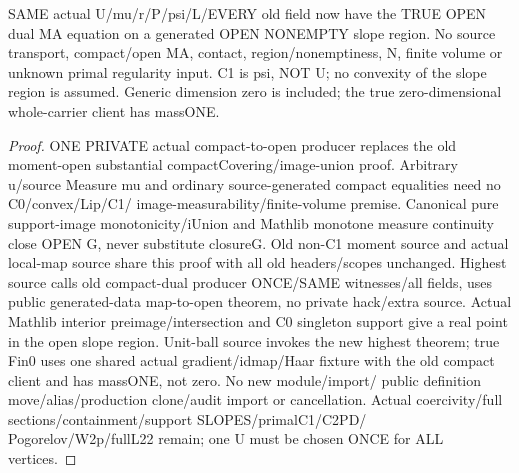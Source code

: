\begin{lemma}
  \label{lem:open-dual-ma}
  \leanok
  SAME actual U/mu/r/P/psi/L/EVERY old field now have the TRUE OPEN dual MA
  equation on a generated OPEN NONEMPTY slope region. No source transport,
  compact/open MA, contact, region/nonemptiness, N, finite volume or unknown
  primal regularity input. C1 is psi, NOT U; no convexity of the slope region
  is assumed. Generic dimension zero is included; the true zero-dimensional
  whole-carrier client has massONE.
\end{lemma}
\begin{proof}
  \leanok
  ONE PRIVATE actual compact-to-open producer replaces the old moment-open
  substantial compactCovering/image-union proof. Arbitrary u/source Measure mu
  and ordinary source-generated compact equalities need no C0/convex/Lip/C1/
  image-measurability/finite-volume premise. Canonical pure support-image
  monotonicity/iUnion and Mathlib monotone measure continuity close OPEN G,
  never substitute closureG. Old non-C1 moment source and actual local-map
  source share this proof with all old headers/scopes unchanged.
  Highest source calls old compact-dual producer ONCE/SAME witnesses/all fields,
  uses public generated-data map-to-open theorem, no private hack/extra source.
  Actual Mathlib interior preimage/intersection and C0 singleton support give
  a real point in the open slope region. Unit-ball source invokes the new
  highest theorem; true Fin0 uses one shared actual gradient/idmap/Haar fixture
  with the old compact client and has massONE, not zero. No new module/import/
  public definition move/alias/production clone/audit import or cancellation.
  Actual coercivity/full sections/containment/support SLOPES/primalC1/C2PD/
  Pogorelov/W2p/fullL22 remain; one U must be chosen ONCE for ALL vertices.
\end{proof}


